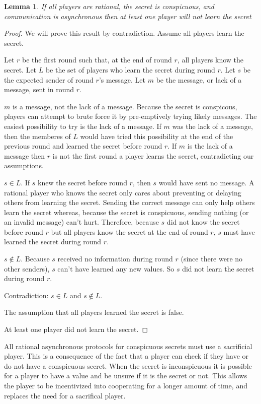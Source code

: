 \documentclass{dalcsthesis}
\newtheorem{lemma}{Lemma}
\begin{document}
\begin{lemma} If all players are rational, the secret is conspicuous, and communication is asynchronous then at least one player will not learn the secret \label{Lem:Async:ConspicuousMustSacrifice} \end{lemma}
\begin{proof}
We will prove this result by contradiction. Assume all players learn the secret.

Let $r$ be the first round such that, at the end of round $r$, all players know the secret. Let $L$ be the set of players who learn the secret during round $r$. Let $s$ be the expected sender of round $r$'s message. Let $m$ be the message, or lack of a message, sent in round $r$.

$m$ is a message, not the lack of a message. Because the secret is conspicous, players can attempt to brute force it by pre-emptively trying likely messages. The easiest possibility to try is the lack of a message. If $m$ was the lack of a message, then the memberes of $L$ would have tried this possibility at the end of the previous round and learned the secret before round $r$. If $m$ is the lack of a message then $r$ is not the first round a player learns the secret, contradicting our assumptions.

$s \in L$. If $s$ knew the secret before round $r$, then $s$ would have sent no message. A rational player who knows the secret only cares about preventing or delaying others from learning the secret. Sending the correct message can only help others learn the secret whereas, because the secret is conspicuous, sending nothing (or an invalid message) can't hurt. Therefore, because $s$ did not know the secret before round $r$ but all players know the secret at the end of round $r$, $s$ must have learned the secret during round $r$.

$s \notin L$. Because $s$ received no information during round $r$ (since there were no other senders), $s$ can't have learned any new values. So $s$ did not learn the secret during round $r$.

Contradiction: $s \in L$ and $s \notin L$.

The assumption that all players learned the secret is false.

At least one player did not learn the secret.
\end{proof}

All rational asynchronous protocols for conspicuous secrets must use a sacrificial player. This is a consequence of the fact that a player can check if they have or do not have a conspicuous secret. When the secret is inconspicuous it is possible for a player to have a value and be unsure if it is the secret or not. This allows the player to be incentivized into cooperating for a longer amount of time, and replaces the need for a sacrifical player.
\end{document}
